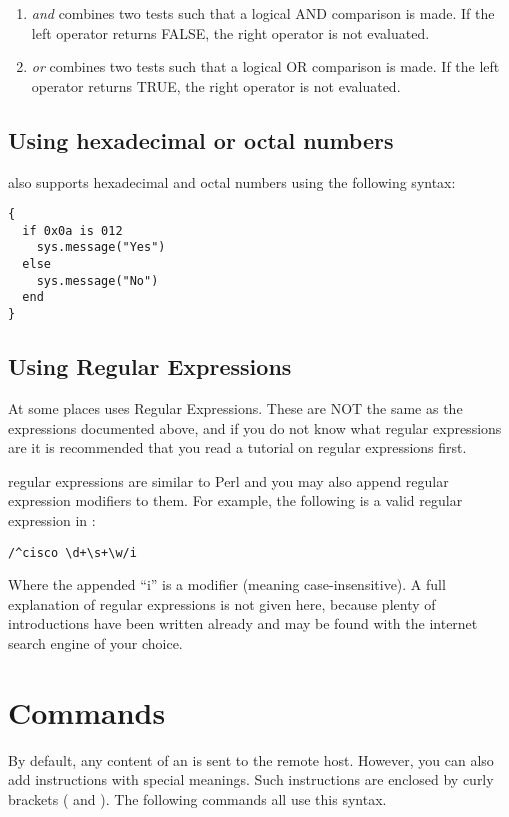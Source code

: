 \begin{enumerate}
\item {\it and} combines two tests such that a logical AND comparison is made. 
If the left operator returns FALSE, the right operator is not evaluated.
\item {\it or} combines two tests such that a logical OR comparison is made. 
If the left operator returns TRUE, the right operator is not evaluated. 
\end{enumerate}


\subsection{Using hexadecimal or octal numbers}

\product also supports hexadecimal and octal numbers using the following 
syntax: 

\begin{lstlisting}
{
  if 0x0a is 012
    sys.message("Yes")
  else
    sys.message("No")
  end
}
\end{lstlisting}


\subsection{Using Regular Expressions}

At some places \product uses Regular Expressions. These are NOT the same as 
the expressions documented above, and if you do not know what regular 
expressions are it is recommended that you read a tutorial on regular 
expressions first.

\product regular expressions are similar to Perl and you may also append 
regular expression modifiers to them. For example, the following is a valid 
regular expression in \product: 

\begin{lstlisting}
/^cisco \d+\s+\w/i
\end{lstlisting}

Where the appended ``i'' is a modifier (meaning case-insensitive). A full 
explanation of regular expressions is not given here, because plenty of 
introductions have been written already and may be found with the internet 
search engine of your choice.


\section{\product Commands}

By default, any content of an \product is sent to the remote host. However, 
you can also add instructions with special meanings. Such instructions are 
enclosed by curly brackets ({ and }). The following commands all use this 
syntax. 

